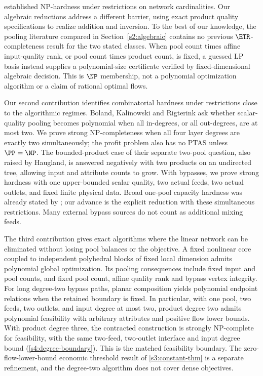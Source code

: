 \citet{haugland2016-the-computational-complexity-of-the} established
NP-hardness under restrictions on network cardinalities. Our algebraic
reductions address a different barrier, using exact product quality
specifications to realize addition and inversion. To the best of our
knowledge, the pooling literature compared in Section~\ref{s2:algebraic}
contains no previous $\ETR$-completeness result for the two stated
classes. When pool count times affine input-quality rank, or pool count
times product count, is fixed, a guessed LP basis instead supplies a
polynomial-size certificate verified by fixed-dimensional algebraic
decision. This is $\NP$ membership, not a polynomial optimization
algorithm or a claim of rational optimal flows.

Our second contribution identifies combinatorial hardness under
restrictions close to the algorithmic regimes. Boland, Kalinowski and
Rigterink \cite[author manuscript, Section~4]{s4:boland2017} ask whether
scalar-quality pooling becomes polynomial when all in-degrees, or all
out-degrees, are at most two. We prove strong NP-completeness when all
four layer degrees are exactly two simultaneously; the profit problem
also has no PTAS unless $\PP=\NP$. The bounded-product case of their
separate two-pool question, also raised by Haugland, is answered negatively
with two products on an undirected tree, allowing input and attribute counts to
grow. With bypasses, we prove strong hardness with one upper-bounded
scalar quality, two actual feeds, two actual outlets, and fixed finite
physical data. Broad one-pool capacity hardness was already stated by
\citet[Remark~4.6]{s3:baltean2018}; our advance is the explicit reduction
with these simultaneous restrictions. Many external bypass sources do
not count as additional mixing feeds.

The third contribution gives exact algorithms where the linear network
can be eliminated without losing pool balances or the objective.
A fixed nonlinear core coupled to independent polyhedral blocks of
fixed local dimension admits polynomial global optimization. Its pooling
consequences include fixed input and pool counts, and fixed pool count,
affine quality rank and bypass vertex integrity. For long degree-two
bypass paths, planar composition yields polynomial endpoint relations
when the retained boundary is fixed. In particular, with one pool, two
feeds, two outlets, and input degree at most two, product degree two
admits polynomial feasibility with arbitrary attributes and positive
flow lower bounds. With product degree three, the contracted construction is strongly
NP-complete for feasibility, with the same two-feed, two-outlet
interface and input degree bound (\cref{s4:degree-boundary}). This
is the matched feasibility boundary. The zero-flow-lower-bound
economic threshold result of \cref{s3:constant-thm} is a separate
refinement, and the degree-two algorithm does not cover dense objectives.

